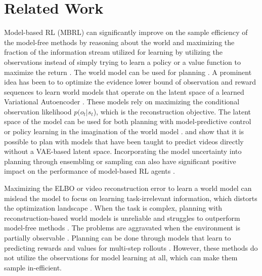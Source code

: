 \documentclass{article}
\theoremstyle{plain}
\theoremstyle{definition}
\theoremstyle{remark}
\begin{document}
\section{Related Work}
\label{sec:related_work}

Model-based RL (MBRL) can significantly improve on the sample efficiency of the model-free methods by reasoning about the world and maximizing the fraction of the information stream utilized for learning by utilizing the observations instead of simply trying to learn a policy or a value function to maximize the return \cite{haRecurrentWorldModels2018}. The world model can be used for planning \cite{allen1983planning, basye1992decision}. A prominent idea has been to to optimize the evidence lower bound of observation and reward sequences to learn world models that operate on the latent space of a learned Variational Autoencoder  \citep[VAE,][]{kingmaAutoEncoding2014, igl2018deep}. These models rely on maximizing the conditional observation likelihood $p(o_t | s_t$), which is the reconstruction objective. The latent space of the model can be used for both planning with model-predictive control \cite{rubinstein1997optimization, hafnerLearning2019} or policy learning in the imagination of the world model \cite{hafner2019dream}. \citet{finn2017deep} and \citet{ebert2018visual} show that it is possible to plan with models that have been taught to predict videos directly without a VAE-based latent space. Incorporating the model uncertainty into planning through ensembling or sampling can also have significant positive impact on the performance of model-based RL agents \cite{deisenrothPILCO2011, chua2018deep, janner2019trust, yu2020mopo, clavera2020model}.

Maximizing the ELBO or video reconstruction error to learn a world model can mislead the model to focus on learning task-irrelevant information, which distorts the optimization landscape \cite{zhang2018natural,zintgraf2021varibad}. When the task is complex, planning with reconstruction-based world models is unreliable \cite{lutter2021learning} and struggles to outperform model-free methods \cite{kostrikov2020image, yarats2021mastering}. The problems are aggravated when the environment is partially observable \cite{morad2023popgym}. Planning can be done through models that learn to predicting rewards and values for multi-step rollouts \cite {tamar2016value, silver2017predictron, oh2017value, schrittwieser2020mastering}. However, these methods do not utilize the observations for model learning at all, which can make them sample in-efficient.
\end{document}
